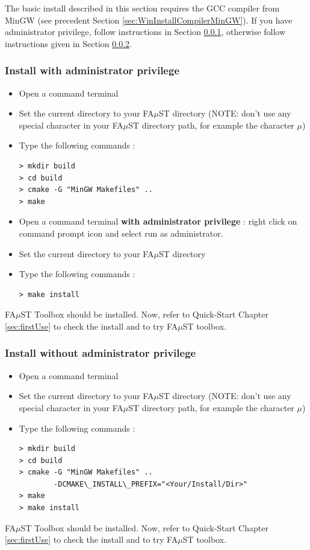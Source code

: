 The basic install described in this section requires the GCC compiler from MinGW (see precedent Section \ref{sec:WinInstallCompilerMinGW}).
If you have administrator privilege, follow instructions in Section \ref{sec:WinMinGWadminBasicInstall}, otherwise follow instructions given in Section \ref{sec:WinMinGWNoAdminBasicInstall}.
\subsubsection{Install with administrator privilege}
\label{sec:WinMinGWadminBasicInstall}

\begin{itemize}
\item Open a command terminal
\item Set the current directory to your FA$\mu$ST directory (NOTE: don't use any special character in your FA$\mu$ST directory path, for example the character $\mu$)
\item Type the following commands : 
\begin{lstlisting}
> mkdir build
> cd build
> cmake -G "MinGW Makefiles" .. 
> make
\end{lstlisting}

\item Open a command terminal \textbf{with administrator privilege} : right click on command prompt icon and select run as administrator. 
\item Set the current directory to your FA$\mu$ST directory
\item Type the following commands : 
\begin{lstlisting}
> make install 
\end{lstlisting}
\end{itemize}

FA$\mu$ST Toolbox should be installed. Now, refer to Quick-Start Chapter \ref{sec:firstUse} to check the install and to try FA$\mu$ST toolbox.


\subsubsection{Install without administrator privilege}
\label{sec:WinMinGWNoAdminBasicInstall}

\begin{itemize}
\item Open a command terminal
\item Set the current directory to your FA$\mu$ST directory (NOTE: don't use any special character in your FA$\mu$ST directory path, for example the character $\mu$)
\item Type the following commands : 
\begin{lstlisting}
> mkdir build
> cd build
> cmake -G "MinGW Makefiles" .. 
	    -DCMAKE\_INSTALL\_PREFIX="<Your/Install/Dir>"
> make
> make install 
\end{lstlisting}
\end{itemize}
FA$\mu$ST Toolbox should be installed. Now, refer to Quick-Start Chapter \ref{sec:firstUse} to check the install and to try FA$\mu$ST toolbox.

